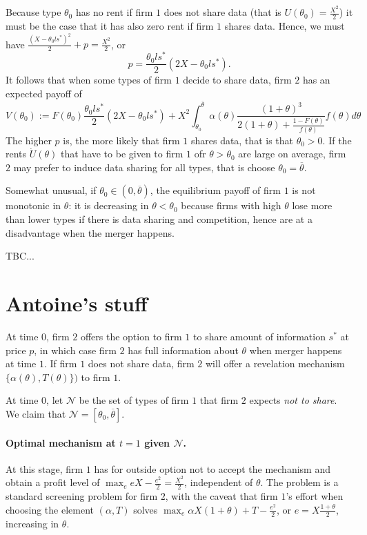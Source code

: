 \documentclass[a4paper]{article}
\newcommand{\N}{\mathcal N}
\renewcommand{\t}{\theta}
\renewcommand{\a}{\alpha}
\begin{document}
Because type $\t_0$ has no rent if firm $1$ does not share data (that is $U(\t_0)=\frac{X^2}{2}$) it must be the case that it has also zero rent if firm $1$ shares data. Hence, we must have $\frac{(X-\t_0 l s^*)^2}{2}+p=\frac{X^2}{2}$, or
%
\[
p=\frac{\t_0 l s^*}{2}(2X-\t_0 l s^*).
\]
%
It follows that when some types of firm $1$ decide to share data, firm $2$ has an expected payoff of 
%
\[
V(\t_0):=F(\t_0)\frac{\t_0 l s^*}{2}(2X-\t_0 l s^*)+X^2\int_{\t_0}^{\overline \t}\a(\t) \frac{(1+\t)^3}{2(1+\t)+\frac{1-F(\t)}{f(\t)}}f(\t)d\t
\]
%
The  higher $p$ is, the more likely that firm $1$ shares data, that is that $\t_0>0$. If the rents $\dot U(\t)$ that have to be given to firm $1$ ofr $\t>\t_0$ are large on average, firm $2$ may prefer to induce data sharing for all types, that is choose $\t_0=\overline \t$.

Somewhat unusual, if $\t_0\in(0,\overline \t)$, the equilibrium payoff of firm $1$ is not monotonic in $\t$: it is decreasing in $\t<\t_0$ because firms with high $\t$ lose more than lower types if there is data sharing and competition, hence are at a disadvantage when the merger happens.


TBC...


\section{Antoine's stuff}


At time $0$, firm $2$ offers the option to firm $1$ to share amount of information $s^*$ at price $p$, in which case firm $2$ has full information about $\t$ when merger happens at time $1$. If firm $1$ does not share data, firm $2$ will offer a revelation mechanism $\{\alpha(\t),T(\t)\})$ to firm $1$.

At time $0$, let $\N$ be the set of types of firm $1$ that firm $2$ expects \emph{not to share}. We claim that $\N=[\t_0,\overline \t]$.
 
\paragraph{Optimal mechanism at $t=1$ given $\N$.} At this stage, firm $1$ has for outside option not to accept the mechanism and obtain a profit level of $\max_e eX -\frac{e^2}{2}=\frac{X^2}{2}$, independent of $\t$. The problem is a standard screening problem for firm $2$, with the caveat that firm $1$'s effort when choosing the element $(\alpha,T)$ solves $\max_e \alpha X(1+\t)+T-\frac{e^2}{2}$, or $e=X\frac{1+\t}{2}$, increasing in $\t$. 
\end{document}
